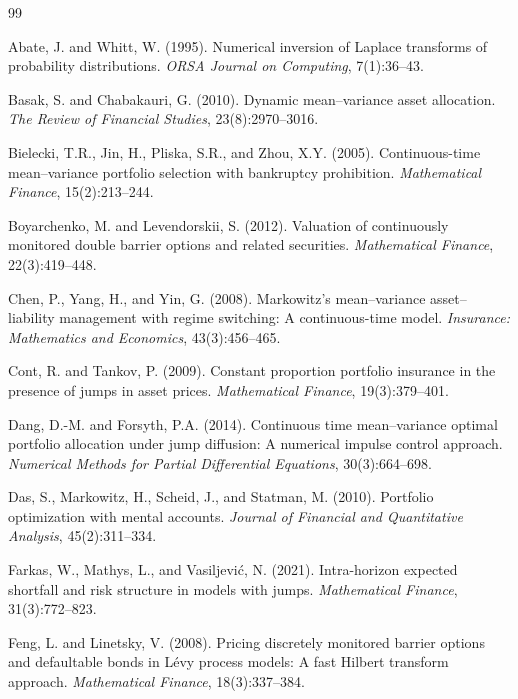 \documentclass[11pt,a4paper]{article}
\numberwithin{equation}{section}
\begin{document}

\begin{thebibliography}{99}

Abate, J. and Whitt, W. (1995). Numerical inversion of Laplace transforms of probability distributions. \textit{ORSA Journal on Computing}, 7(1):36--43.

Basak, S. and Chabakauri, G. (2010). Dynamic mean--variance asset allocation. \textit{The Review of Financial Studies}, 23(8):2970--3016.

Bielecki, T.R., Jin, H., Pliska, S.R., and Zhou, X.Y. (2005). Continuous-time mean--variance portfolio selection with bankruptcy prohibition. \textit{Mathematical Finance}, 15(2):213--244.

Boyarchenko, M. and Levendorskii, S. (2012). Valuation of continuously monitored double barrier options and related securities. \textit{Mathematical Finance}, 22(3):419--448.

Chen, P., Yang, H., and Yin, G. (2008). Markowitz's mean--variance asset--liability management with regime switching: A continuous-time model. \textit{Insurance: Mathematics and Economics}, 43(3):456--465.

Cont, R. and Tankov, P. (2009). Constant proportion portfolio insurance in the presence of jumps in asset prices. \textit{Mathematical Finance}, 19(3):379--401.

Dang, D.-M. and Forsyth, P.A. (2014). Continuous time mean--variance optimal portfolio allocation 
under jump diffusion: A numerical impulse control approach. \textit{Numerical Methods for Partial 
Differential Equations}, 30(3):664--698.

Das, S., Markowitz, H., Scheid, J., and Statman, M. (2010). Portfolio optimization with mental accounts. \textit{Journal of Financial and Quantitative Analysis}, 45(2):311--334.

Farkas, W., Mathys, L., and Vasiljevi\'c, N. (2021). Intra-horizon expected shortfall and risk structure in models with jumps. \textit{Mathematical Finance}, 31(3):772--823.

Feng, L. and Linetsky, V. (2008). Pricing discretely monitored barrier options and defaultable bonds in L\'evy process models: A fast Hilbert transform approach. \textit{Mathematical Finance}, 18(3):337--384.


\end{thebibliography}
\end{document}
